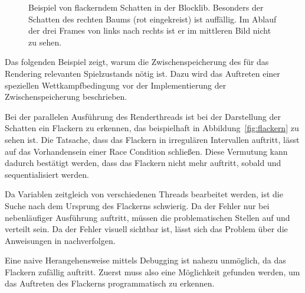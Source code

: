 \begin{figure}
	\hfill
	\hfill
	\caption[Beispiel von flackerndem Schatten in der Blocklib.]{Beispiel von flackerndem Schatten in der Blocklib. Besonders der Schatten des rechten Baums (rot eingekreist) ist auffällig. Im Ablauf der drei Frames von links nach rechts ist er im mittleren Bild nicht zu sehen.}\label{fig:flackern}
\end{figure}
Das folgenden Beispiel zeigt, warum die Zwischenspeicherung des für das Rendering relevanten Spielzustands nötig ist. Dazu wird das Auftreten einer speziellen Wettkampfbedingung vor der Implementierung der Zwischenspeicherung beschrieben. 

Bei der parallelen Ausführung des Renderthreads ist bei der Darstellung der Schatten ein Flackern zu erkennen, das beispielhaft in Abbildung~\vref{fig:flackern} zu sehen ist. Die Tatsache, dass das Flackern in irregulären Intervallen auftritt, lässt auf das Vorhandensein einer Race Condition schließen. Diese Vermutung kann dadurch bestätigt werden, dass das Flackern nicht mehr auftritt, sobald  und  sequentialisiert werden.

Da Variablen zeitgleich von verschiedenen Threads bearbeitet werden, ist die Suche nach dem Ursprung des Flackerns schwierig. Da der Fehler nur bei nebenläufiger Ausführung auftritt, müssen die problematischen Stellen auf  und  verteilt sein. Da der Fehler visuell sichtbar ist, lässt sich das Problem über die Anweisungen in  nachverfolgen. 

Eine naive Herangehensweise mittels Debugging ist nahezu unmöglich, da das Flackern zufällig auftritt. Zuerst muss also eine Möglichkeit gefunden werden, um das Auftreten des Flackerns programmatisch zu erkennen.

